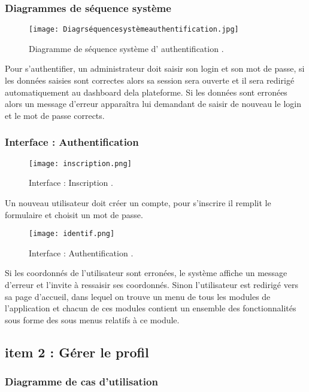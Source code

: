 \subsubsection{Diagrammes de séquence système }
\begin{figure}[ht]
	\centering
	\texttt{[image: Diagrséquencesystèmeauthentification.jpg]}
	\caption{Diagramme de séquence système d' authentification .}
	\label{fig:Diagramme de séquence système d' authentification }
\end{figure}
\FloatBarrier
Pour s’authentifier, un administrateur doit saisir son login et son mot de passe, si les
données saisies sont correctes alors sa session sera ouverte et il sera redirigé automatiquement au dashboard dela plateforme. Si les données sont erronées alors un message d’erreur
apparaîtra lui demandant de saisir de nouveau le login et le mot de passe corrects.
\clearpage
\subsubsection{ Interface : Authentification  }


\begin{figure}[ht]
	\centering
	\texttt{[image: inscription.png]}
	\caption{Interface : Inscription .}
	\label{fig:Interface : inscription }
\end{figure}
\FloatBarrier
Un nouveau utilisateur doit créer un compte, pour s’inscrire il remplit le formulaire et
choisit un mot de passe. 


\begin{figure}[ht]
	\centering
	\texttt{[image: identif.png]}
	\caption{Interface : Authentification .}
	\label{fig:Interface : Authentification }
\end{figure}
\FloatBarrier
Si les coordonnés de l’utilisateur sont erronées, le système affiche un message d’erreur et
l’invite à ressaisir ses coordonnés.
Sinon l’utilisateur est redirigé vers sa page d’accueil, dans lequel on trouve un menu de tous les
modules de l’application et chacun de ces modules contient un ensemble des fonctionnalités
sous forme des sous menus relatifs à ce module.
\clearpage
\subsection{item 2 : Gérer le profil}
\subsubsection{Diagramme de cas d’utilisation }


